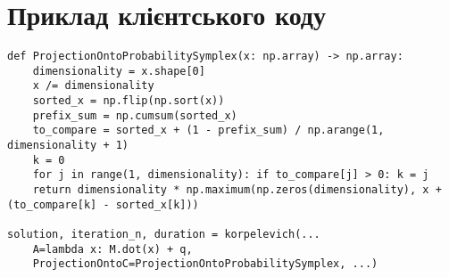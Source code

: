 \section{Приклад клієнтського коду}

\begin{verbatim}
def ProjectionOntoProbabilitySymplex(x: np.array) -> np.array:
    dimensionality = x.shape[0]
    x /= dimensionality
    sorted_x = np.flip(np.sort(x))
    prefix_sum = np.cumsum(sorted_x)
    to_compare = sorted_x + (1 - prefix_sum) / np.arange(1, dimensionality + 1)
    k = 0
    for j in range(1, dimensionality): if to_compare[j] > 0: k = j
    return dimensionality * np.maximum(np.zeros(dimensionality), x + (to_compare[k] - sorted_x[k]))

solution, iteration_n, duration = korpelevich(...
    A=lambda x: M.dot(x) + q,
    ProjectionOntoC=ProjectionOntoProbabilitySymplex, ...)
\end{verbatim}